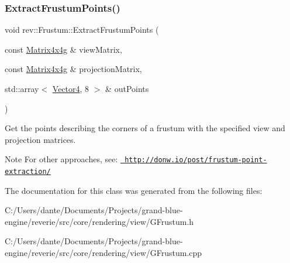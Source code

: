 \subsubsection{\texorpdfstring{ExtractFrustumPoints()}{ExtractFrustumPoints()}}
{\footnotesize\ttfamily void rev\+::\+Frustum\+::\+Extract\+Frustum\+Points (\begin{DoxyParamCaption}\item[{const \mbox{\hyperlink{classrev_1_1_square_matrix}{Matrix4x4g}} \&}]{view\+Matrix,  }\item[{const \mbox{\hyperlink{classrev_1_1_square_matrix}{Matrix4x4g}} \&}]{projection\+Matrix,  }\item[{std\+::array$<$ \mbox{\hyperlink{classrev_1_1_vector}{Vector4}}, 8 $>$ \&}]{out\+Points }\end{DoxyParamCaption})\hspace{0.3cm}{\ttfamily [static]}}



Get the points describing the corners of a frustum with the specified view and projection matrices. 

\begin{DoxyNote}{Note}
For other approaches, see\+: \href{http://donw.io/post/frustum-point-extraction/}{\texttt{ http\+://donw.\+io/post/frustum-\/point-\/extraction/}} 
\end{DoxyNote}


The documentation for this class was generated from the following files\+:\begin{DoxyCompactItemize}
\item 
C\+:/\+Users/dante/\+Documents/\+Projects/grand-\/blue-\/engine/reverie/src/core/rendering/view/G\+Frustum.\+h\item 
C\+:/\+Users/dante/\+Documents/\+Projects/grand-\/blue-\/engine/reverie/src/core/rendering/view/G\+Frustum.\+cpp\end{DoxyCompactItemize}
